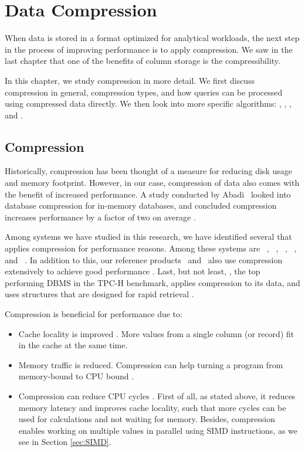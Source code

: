 \chapter{Data Compression}
\label{chap:Data Compression}
When data is stored in a format optimized for analytical workloads, the next step in the process of improving performance is to apply compression. We saw in the last chapter that one of the benefits of column storage is the compressibility. 

In this chapter, we study compression in more detail. We first discuss compression in general, compression types, and how queries can be processed using compressed data directly. We then look into more specific algorithms: \bp, \de, \dele, and \rle.

\newpage

\section{Compression}
\label{sec:Compression}
Historically, compression has been thought of a measure for reducing disk usage and memory footprint. However, in our case, compression of data also comes with the benefit of increased performance. A study conducted by Abadi \ea~looked into database compression for in-memory databases, and concluded compression increases performance by a factor of two on average \cite{Abadi2008-dd}.

Among systems we have studied in this research, we have identified several that applies compression for performance reasons. Among these systems are \ibm~\cite{Raman2013-em}, \cstore~\cite{Stonebraker2005-qz}, \vertica~\cite{Lamb2012-kg}, \oracle~\cite{Oracle2015-fs}, and \gorilla~\cite{Pelkonen2015-ko}. In addition to this, our reference products \tableau~and \qlikview~also use compression extensively to achieve good performance \cite{Kamkolkar2015-iq, Qlik2014-vd}. Last, but not least, \exasol, the top performing DBMS in the TPC-H benchmark, applies compression to its data, and uses structures that are designed for rapid retrieval \cite{Exasol2014-xh}.


Compression is beneficial for performance due to:
\begin{itemize}
  \item Cache locality is improved \cite{Exasol2014-xh}. More values from a single column (or record) fit in the cache at the same time.
  \item Memory traffic is reduced. Compression can help turning a program from memory-bound to CPU bound \cite{Willhalm2009-hu}.
  \item Compression can reduce CPU cycles \cite{Stonebraker2005-qz}. First of all, as stated above, it reduces memory latency and improves cache locality, such that more cycles can be used for calculations and not waiting for memory. Besides, compression enables working on multiple values in parallel using SIMD instructions, as we see in Section \ref{sec:SIMD}.
\end{itemize}

